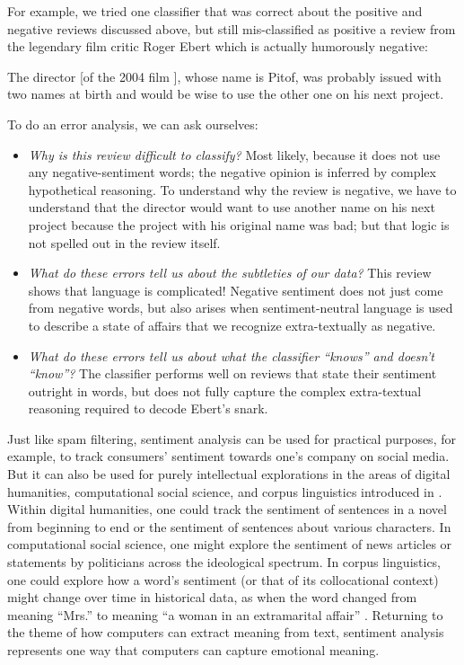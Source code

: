For example, we tried one classifier that was correct about the positive and negative reviews discussed above, but still mis-classified as positive a review from the legendary film critic Roger Ebert which is actually humorously negative:



\ea  The director [of the 2004 film ], whose name is Pitof, was probably issued with two names at birth and would be wise to use the other one on his next project.
\z 





To do an error analysis, we can ask ourselves:  

\begin{itemize}

\item \emph{Why is this review difficult to classify?} Most likely, because it does not use any negative-sentiment words; the negative opinion is inferred by complex hypothetical reasoning.  To understand why the  review is negative, we have to understand that the director would want to use another name on his next project because the  project with his original name was bad; but that logic is not spelled out in the review itself.

\item \emph{What do these errors tell us about the subtleties of our data?} This review shows that language is complicated! Negative sentiment does not just come from negative words, but also arises when sentiment-neutral language is used to describe a state of affairs that we recognize extra-textually as negative.
 

\item \emph{What do these errors tell us about what the classifier ``knows'' and doesn't ``know''?}  The classifier performs well on reviews that state their sentiment outright in words, but does not fully capture the complex extra-textual reasoning required to decode Ebert's snark.

\end{itemize}

Just like spam filtering, sentiment analysis can be used for practical purposes, for example, to track consumers' sentiment towards one's company on social media.  But it can also be used for purely intellectual explorations in the areas of digital humanities, computational social science, and corpus linguistics introduced in .  Within digital humanities, one could track the sentiment of sentences in a novel from beginning to end or the sentiment of sentences about various characters.  In computational social science, one might explore the sentiment of news articles or statements by politicians across the ideological spectrum.  In corpus linguistics, one could explore how a word's sentiment (or that of its collocational context) might change over time in historical data, as when the word  changed from meaning ``Mrs.'' to meaning ``a woman in an extramarital affair'' \citep{TraugottDasher:2001}.  Returning to the theme of how computers can extract meaning from text,  sentiment analysis represents one way that computers can capture emotional meaning.

